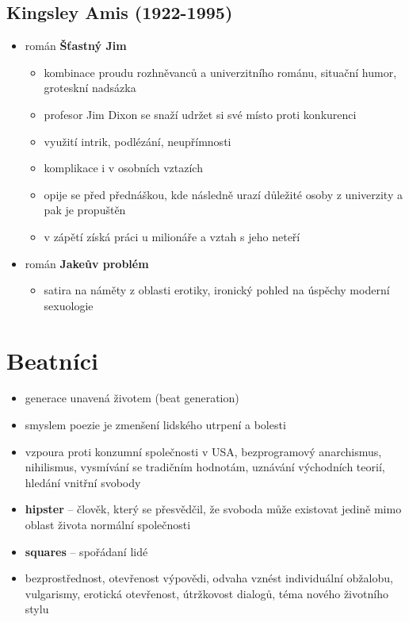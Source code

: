\subsection{Kingsley Amis (1922-1995)}
\begin{itemize}
\item román \textbf{Šťastný Jim}
\begin{itemize}
\item kombinace proudu rozhněvanců a univerzitního románu, situační humor, groteskní nadsázka
\item profesor Jim Dixon se snaží udržet si své místo proti konkurenci
\item využití intrik, podlézání, neupřímnosti
\item komplikace i  v osobních vztazích
\item opije se před přednáškou, kde následně urazí důležité osoby z univerzity a pak je propuštěn
\item v zápětí získá práci u milionáře a vztah s jeho neteří
\end{itemize}
\item román \textbf{Jakeův problém}
\begin{itemize}
\item satira na náměty z oblasti erotiky, ironický pohled na úspěchy moderní sexuologie
\end{itemize}
\end{itemize}

\section{Beatníci}
\begin{itemize}
\item generace unavená životem (beat generation)
\item smyslem poezie je zmenšení lidského utrpení a bolesti
\item vzpoura proti konzumní společnosti v USA, bezprogramový anarchismus, nihilismus, vysmívání se tradičním hodnotám, uznávání východních teorií, hledání vnitřní svobody 
\item \textbf{hipster} -- člověk, který se přesvědčil, že svoboda může existovat jedině mimo oblast života normální společnosti
\item \textbf{squares} -- spořádaní lidé
\item bezprostřednost, otevřenost výpovědi, odvaha vznést individuální obžalobu, vulgarismy, erotická otevřenost, útržkovost dialogů, téma nového životního stylu
\end{itemize}


